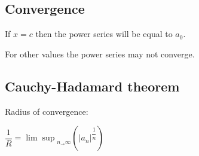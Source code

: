 
\subsection{Convergence}

If \(x=c\) then the power series will be equal to \(a_0\).

For other values the power series may not converge.

\subsection{Cauchy-Hadamard theorem}

Radius of convergence:

\(\dfrac{1}{R}={\lim \sup}_{n_\rightarrow \infty} (|a_n|^{\dfrac{1}{n}})\)


